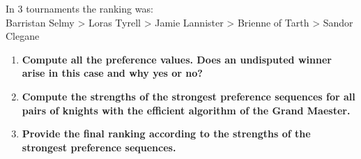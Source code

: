 \documentclass[11pt]{article}
\begin{document}
\begin{enumerate}[label=\textbf{\Alph*.}]
\noindent In 3 tournaments the ranking was:\\ Barristan Selmy > Loras Tyrell >
Jamie Lannister > Brienne of Tarth > Sandor Clegane\\

\begin{enumerate}
\item \textbf{Compute all the preference values. Does an undisputed winner
arise in this case and why yes or no?}\\

\item  \textbf{Compute the strengths of the strongest preference
sequences for all pairs of knights with the efficient algorithm of the
Grand Maester.}\\

\item  \textbf{Provide the final ranking according to the strengths of
the strongest preference sequences.}\\
\end{enumerate}
\end{enumerate}
\end{document}
